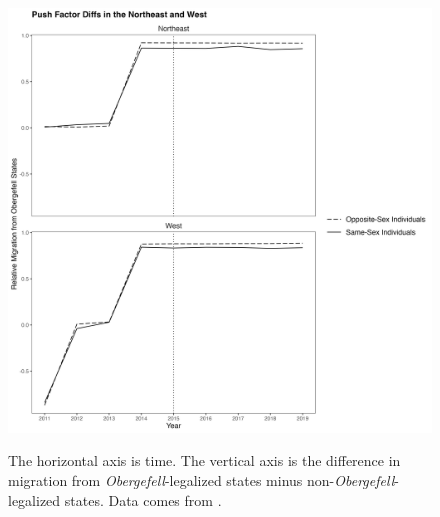 \documentclass[12pt,letterpaper]{article}
\begin{document}
\begin{figure}[htbp]
    \centering
    \caption{}
    \label{fig: region_ante_diffs_app}
    \includegraphics[width=.75\linewidth]{outputs/summary_stats/region_ante_diffs_app.png}

    \vspace{0.5em}
    \begin{minipage}{0.75\linewidth}
        \footnotesize The horizontal axis is time. The vertical axis is the difference in migration from \textit{Obergefell}-legalized states minus non-\textit{Obergefell}-legalized states. Data comes from \citet{28}.
    \end{minipage}
\end{figure}
\end{document}
